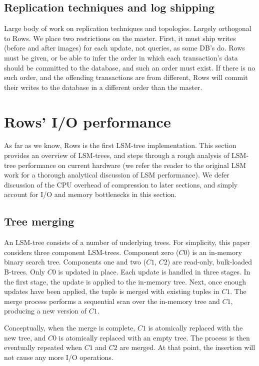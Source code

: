\documentclass{sig-alternate-sigmod08}
\newcommand{\rows}{Rows\xspace}
\newcommand{\rowss}{Rows'\xspace}
\begin{document}
\subsection{Replication techniques and log shipping}
Large body of work on replication techniques and topologies.  Largely
orthogonal to \rows.  We place two restrictions on the master.  First,
it must ship writes (before and after images) for each update, not
queries, as some DB's do.  \rows must be given, or be able to infer
the order in which each transaction's data should be committed to the
database, and such an order must exist.  If there is no such order,
and the offending transactions are from different, \rows will commit
their writes to the database in a different order than the master.

\section{\rowss I/O performance}

As far as we know, \rows is the first LSM-tree implementation.  This
section provides an overview of LSM-trees, and steps through a rough
analysis of LSM-tree performance on current hardware (we refer the
reader to the original LSM work for a thorough analytical
discussion of LSM performance).  We defer discussion of the CPU
overhead of compression to later sections, and simply account for I/O
and memory bottlenecks in this section.

\subsection{Tree merging}


An LSM-tree consists of a number of underlying trees.  For simplicity,
this paper considers three component LSM-trees.  Component zero ($C0$)
is an in-memory binary search tree.  Components one and two ($C1$,
$C2$) are read-only, bulk-loaded B-trees.  Only $C0$ is updated in
place.  Each update is handled in three stages.  In the first stage,
the update is applied to the in-memory tree.  Next, once enough
updates have been applied, the tuple is merged with existing tuples in
$C1$.  The merge process performs a sequential scan over the in-memory
tree and $C1$, producing a new version of $C1$.

Conceptually, when the merge is complete, $C1$ is atomically replaced
with the new tree, and $C0$ is atomically replaced with an empty tree.
The process is then eventually repeated when $C1$ and $C2$ are merged.
At that point, the insertion will not cause any more I/O operations.
\end{document}
